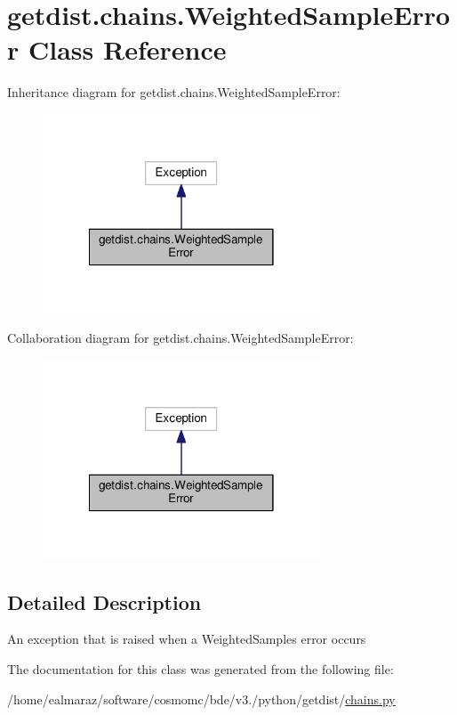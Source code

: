 \hypertarget{classgetdist_1_1chains_1_1WeightedSampleError}{}\section{getdist.\+chains.\+Weighted\+Sample\+Error Class Reference}
\label{classgetdist_1_1chains_1_1WeightedSampleError}


Inheritance diagram for getdist.\+chains.\+Weighted\+Sample\+Error\+:
\nopagebreak
\begin{figure}[H]
\begin{center}
\leavevmode
\includegraphics[width=234pt]{classgetdist_1_1chains_1_1WeightedSampleError__inherit__graph}
\end{center}
\end{figure}


Collaboration diagram for getdist.\+chains.\+Weighted\+Sample\+Error\+:
\nopagebreak
\begin{figure}[H]
\begin{center}
\leavevmode
\includegraphics[width=234pt]{classgetdist_1_1chains_1_1WeightedSampleError__coll__graph}
\end{center}
\end{figure}


\subsection{Detailed Description}
\begin{DoxyVerb}An exception that is raised when a WeightedSamples error occurs
\end{DoxyVerb}
 

The documentation for this class was generated from the following file\+:\begin{DoxyCompactItemize}
\item 
/home/ealmaraz/software/cosmomc/bde/v3./python/getdist/\mbox{\hyperlink{chains_8py}{chains.\+py}}\end{DoxyCompactItemize}
